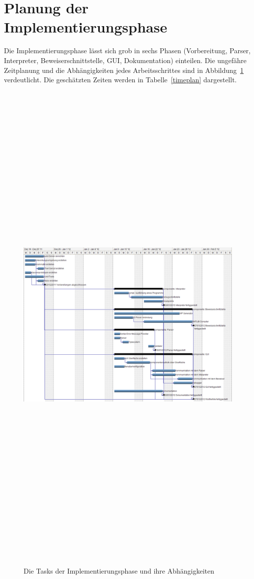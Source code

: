 \section{Planung der Implementierungsphase}

Die Implementierungsphase lässt sich grob in sechs Phasen (Vorbereitung, Parser, Interpreter, Beweiserschnittstelle, GUI, Dokumentation) einteilen. Die ungefähre Zeitplanung und die Abhängigkeiten jedes Arbeitsschrittes sind in Abbildung~\ref{gantt_impl} verdeutlicht. Die geschätzten Zeiten werden in Tabelle~\ref{timeplan} dargestellt.

\begin{figure}
	\centering
	\hspace*{-2cm}\vspace*{-2cm}\caption[B]{Die Tasks der Implementierungsphase und ihre Abhängigkeiten}
	\hspace*{-3cm}\vspace*{-3cm}\includegraphics[angle=90,width=19cm,height= 25cm]{diagrams/gantt_implementierung_diag.png}
	\label{gantt_impl}
\end{figure}

